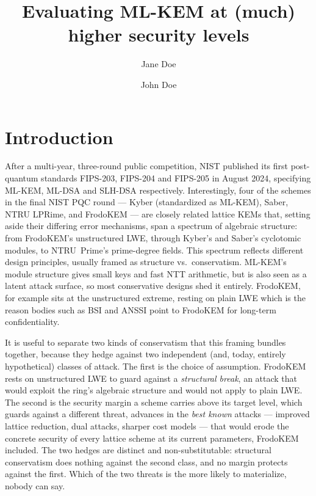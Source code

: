 \documentclass[journal=tosc,submission]{iacrtrans}
\author{Jane Doe\inst{1,2} \and John Doe\inst{1}}
\institute{
  Institute A, City, Country, \email{jane@institute}
  \and
  Institute B, City, Country, \email{john@institute}
}
\title{Evaluating ML-KEM at (much) higher security levels}
\begin{document}
\maketitle




\begin{abstract}
\end{abstract}


\section{Introduction}

After a multi-year, three-round public competition, NIST published its first post-quantum standards FIPS-203, FIPS-204 and FIPS-205 in August 2024,
specifying ML-KEM, ML-DSA and SLH-DSA respectively. Interestingly, four of the schemes in the final NIST PQC round --- Kyber (standardized as ML-KEM), Saber, NTRU LPRime, and FrodoKEM --- are closely related lattice KEMs that, setting aside their differing error mechanisms, span a spectrum of algebraic structure: from FrodoKEM's unstructured LWE, through Kyber's and Saber's cyclotomic modules, to NTRU~Prime's prime-degree fields.
This spectrum reflects different design principles, usually framed as structure vs.\ conservatism. ML-KEM's module structure gives small keys and fast NTT arithmetic, but is also seen as a latent attack surface, so most conservative designs shed it entirely. FrodoKEM, for example sits at the unstructured extreme, resting on plain LWE which is the reason bodies such as BSI and ANSSI point to FrodoKEM for long-term confidentiality.

It is useful to separate two kinds of conservatism that this framing bundles together, because they hedge against two independent (and, today, entirely hypothetical) classes of attack.
The first is the choice of assumption. FrodoKEM rests on unstructured LWE to guard against a \emph{structural break}, an attack that would exploit the ring's algebraic structure and would not apply to plain LWE.
The second is the security margin a scheme carries above its target level, which guards against a different threat, advances in the \emph{best known} attacks --- improved lattice reduction, dual attacks, sharper cost models --- that would erode the concrete security of every lattice scheme at its current parameters, FrodoKEM included.
The two hedges are distinct and non-substitutable: structural conservatism does nothing against the second class, and no margin protects against the first. Which of the two threats is the more likely to materialize, nobody can say.
\end{document}
